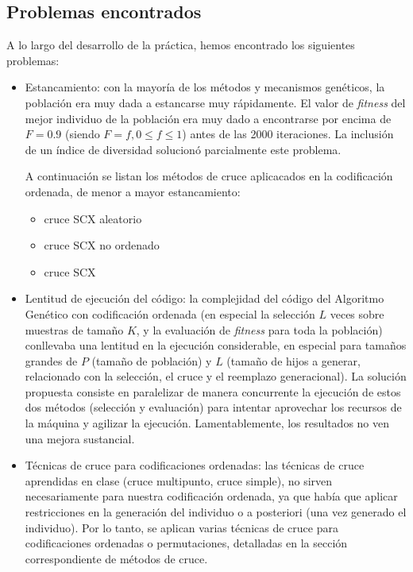 \documentclass[12pt]{article}
\begin{document}
\subsection{Problemas encontrados}

A lo largo del desarrollo de la práctica, hemos encontrado los siguientes problemas:

\begin{itemize}
    \item Estancamiento: con la mayoría de los métodos y mecanismos genéticos, la población era muy dada a estancarse muy rápidamente. El valor de \emph{fitness} del mejor individuo de la población era muy dado a encontrarse por encima de $F=0.9$ (siendo $F=f, 0\le f\le1$) antes de las 2000 iteraciones. La inclusión de un índice de diversidad solucionó parcialmente este problema.

    A continuación se listan los métodos de cruce aplicacados en la codificación ordenada, de menor a mayor estancamiento:
    \begin{itemize}
        \item cruce SCX aleatorio
        \item cruce SCX no ordenado
        \item cruce SCX
    \end{itemize}
    \item Lentitud de ejecución del código: la complejidad del código del Algoritmo Genético con codificación ordenada (en especial la selección $L$ veces sobre muestras de tamaño $K$, y la evaluación de \emph{fitness} para toda la población) conllevaba una lentitud en la ejecución considerable, en especial para tamaños grandes de $P$ (tamaño de población) y $L$ (tamaño de hijos a generar, relacionado con la selección, el cruce y el reemplazo generacional). La solución propuesta consiste en paralelizar de manera concurrente la ejecución de estos dos métodos (selección y evaluación) para intentar aprovechar los recursos de la máquina y agilizar la ejecución. Lamentablemente, los resultados no ven una mejora sustancial.
    \item Técnicas de cruce para codificaciones ordenadas: las técnicas de cruce aprendidas en clase (cruce multipunto, cruce simple), no sirven necesariamente para nuestra codificación ordenada, ya que había que aplicar restricciones en la generación del individuo o a posteriori (una vez generado el individuo). Por lo tanto, se aplican varias técnicas de cruce para codificaciones ordenadas o permutaciones, detalladas en la sección correspondiente de métodos de cruce.
\end{itemize}
\end{document}
